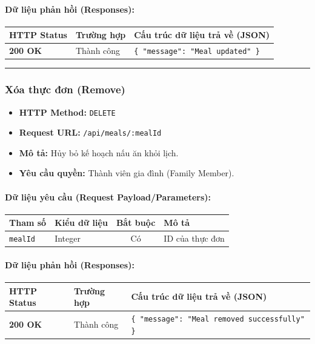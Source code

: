 \documentclass[12pt,a4paper]{article}
\begin{document}
\paragraph{Dữ liệu phản hồi (Responses):}
\begin{longtable}{|p{2.8cm}|p{3.2cm}|p{8.0cm}|}
\hline
\textbf{HTTP Status} & \textbf{Trường hợp} & \textbf{Cấu trúc dữ liệu trả về (JSON)} \\ \hline
\endhead
\textbf{200 OK} & Thành công & \texttt{\{ "message": "Meal updated" \}} \\ \hline
\end{longtable}

\vskip 0.4cm
\noindent\rule{\textwidth}{0.3pt}
\vskip 0.4cm

\subsubsection{Xóa thực đơn (Remove)}
\begin{itemize}[leftmargin=*]
    \item \textbf{HTTP Method:} \texttt{DELETE}
    \item \textbf{Request URL:} \texttt{/api/meals/:mealId}
    \item \textbf{Mô tả:} Hủy bỏ kế hoạch nấu ăn khỏi lịch.
    \item \textbf{Yêu cầu quyền:} Thành viên gia đình (Family Member).
\end{itemize}

\paragraph{Dữ liệu yêu cầu (Request Payload/Parameters):}
\begin{longtable}{|p{2.8cm}|p{2.2cm}|c|p{7.0cm}|}
\hline
\textbf{Tham số} & \textbf{Kiểu dữ liệu} & \textbf{Bắt buộc} & \textbf{Mô tả} \\ \hline
\endhead
\texttt{mealId} & Integer & Có & ID của thực đơn \\ \hline
\end{longtable}

\paragraph{Dữ liệu phản hồi (Responses):}
\begin{longtable}{|p{2.8cm}|p{3.2cm}|p{8.0cm}|}
\hline
\textbf{HTTP Status} & \textbf{Trường hợp} & \textbf{Cấu trúc dữ liệu trả về (JSON)} \\ \hline
\endhead
\textbf{200 OK} & Thành công & \texttt{\{ "message": "Meal removed successfully" \}} \\ \hline
\end{longtable}
\end{document}
